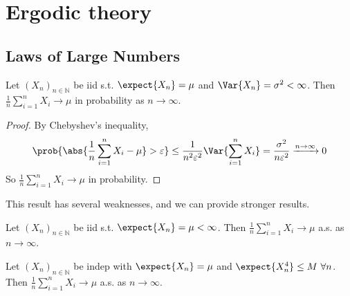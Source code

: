 \section{Ergodic theory}

\subsection{Laws of Large Numbers}

\begin{proposition}
	Let $(X_n)_{n \in \mathbb N}$ be iid s.t. $\expect{X_n} = \mu$ and $\Var{X_n} = \sigma^2 < \infty$.
	Then $\frac{1}{n} \sum_{i=1}^n X_i \to \mu$ in probability as $n \to \infty$.
\end{proposition}

\begin{proof}
	By Chebyshev's inequality,
	\begin{align*}
        \prob{\abs{\frac{1}{n}\sum_{i=1}^n X_i - \mu} > \varepsilon} \leq \frac{1}{n^2 \varepsilon^2} \Var{\sum_{i=1}^n X_i} = \frac{\sigma^2}{n\varepsilon^2} \xrightarrow{n \to \infty} 0
    \end{align*}
	So $\frac{1}{n} \sum_{i=1}^n X_i \to \mu$ in probability.
\end{proof}

This result has several weaknesses, and we can provide stronger results.

\begin{proposition}
	Let $(X_n)_{n \in \mathbb N}$ be iid s.t. $\expect{X_n} = \mu < \infty$.
	Then $\frac{1}{n} \sum_{i=1}^n X_i \to \mu$ a.s. as $n \to \infty$.
\end{proposition}

\begin{proposition}
	Let $(X_n)_{n \in \mathbb N}$ be indep with $\expect{X_n} = \mu$ and $\expect{X_n^4} \leq M \ \forall n$.
	Then $\frac{1}{n} \sum_{i=1}^n X_i \to \mu$ a.s. as $n \to \infty$.
\end{proposition}

